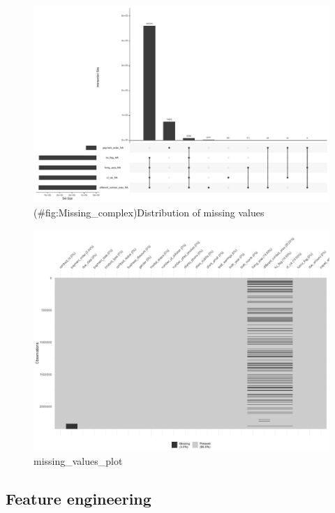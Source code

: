 \documentclass[
]{article}
\begin{document}
\begin{figure}
\centering
\includegraphics{Documentation_Rmarkdown_files/figure-latex/Missing_complex-1.pdf}
\caption{(\#fig:Missing\_complex)\label{fig:Missing_complex}Distribution of missing values}
\end{figure}

\begin{figure}
\centering
\includegraphics{missing_values_plot.png}
\caption{missing\_values\_plot}
\end{figure}

\hypertarget{feature-engineering}{%
\subsection{Feature engineering}\label{feature-engineering}}
\end{document}
